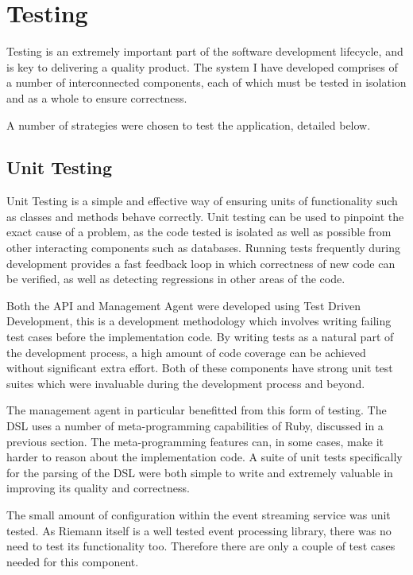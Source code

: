 \documentclass{cshonours}
\begin{document}
\chapter{Testing}

Testing is an extremely important part of the software development lifecycle, and is key to delivering a quality product. The system I have developed comprises of a number of interconnected components, each of which must be tested in isolation and as a whole to ensure correctness.

A number of strategies were chosen to test the application, detailed below.

\section{Unit Testing}

Unit Testing is a simple and effective way of ensuring units of functionality such as classes and methods behave correctly. Unit testing can be used to pinpoint the exact cause of a problem, as the code tested is isolated as well as possible from other interacting components such as databases. Running tests frequently during development provides a fast feedback loop in which correctness of new code can be verified, as well as detecting regressions in other areas of the code.

Both the API and Management Agent were developed using Test Driven Development, this is a development methodology which involves writing failing test cases before the implementation code. By writing tests as a natural part of the development process, a high amount of code coverage can be achieved without significant extra effort. Both of these components have strong unit test suites which were invaluable during the development process and beyond.

The management agent in particular benefitted from this form of testing. The DSL uses a number of meta-programming capabilities of Ruby, discussed in a previous section. The meta-programming features can, in some cases, make it harder to reason about the implementation code. A suite of unit tests specifically for the parsing of the DSL were both simple to write and extremely valuable in improving its quality and correctness.

The small amount of configuration within the event streaming service was unit tested. As Riemann itself is a well tested event processing library, there was no need to test its functionality too. Therefore there are only a couple of test cases needed for this component.
\end{document}
